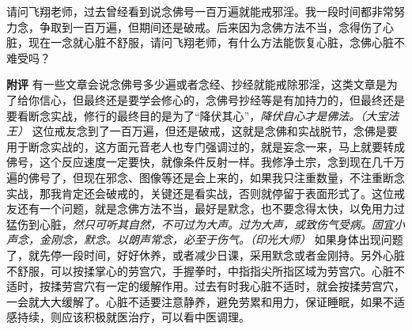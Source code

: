 \begin{case}
    请问飞翔老师，过去曾经看到说念佛号一百万遍就能戒邪淫。我一段时间都非常努力念，争取到一百万遍，但期间还是破戒。后来因为念佛方法不当，念得伤了心脏，现在一念就心脏不舒服，请问飞翔老师，有什么方法能恢复心脏，念佛心脏不难受吗？

    \textbf{附评} 有一些文章会说念佛号多少遍或者念经、抄经就能戒除邪淫，这类文章是为了给你信心，但最终还是要学会修心的，念佛号抄经等是有加持力的，但最终还是要看断念实战，修行的最终目的是为了“降伏其心”，\textit{降伏自心才是佛法。（大宝法王）} 这位戒友念到了一百万遍，但还是破戒，这就是念佛和实战脱节，念佛是要用于断念实战的，这方面元音老人也专门强调过的，就是妄念一来，马上就要转成佛号，这个反应速度一定要快，就像条件反射一样。我修净土宗，念到现在几千万遍的佛号了，但现在邪念、图像等还是会上来的，如果我只注重数量，不注重断念实战，那我肯定还会破戒的，关键还是看实战，否则就停留于表面形式了。这位戒友还有一个问题，就是念佛方法不当，最好是默念，也不要念得太快，以免用力过猛伤到心脏，\textit{然只可听其自然，不可过为大声。过为大声，或致伤气受病。固宜小声念，金刚念，默念。以朗声常念，必至于伤气。（印光大师）} 如果身体出现问题了，就先停一段时间，好好休养，或者减少日课，采用默念或者金刚持。另外心脏不舒服，可以按揉掌心的劳宫穴，手握拳时，中指指尖所指区域为劳宫穴。心脏不适时，按揉劳宫穴有一定的缓解作用。过去有时我心脏不适时，就会按揉劳宫穴，一会就大大缓解了。心脏不适要注意静养，避免劳累和用力，保证睡眠，如果不适感持续，则应该积极就医治疗，可以看中医调理。
\end{case}

